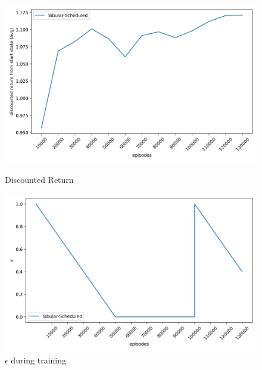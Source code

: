 \begin{figure}[H]
    \vspace{0.5em}

    \begin{minipage}{0.32\linewidth}
        \centering
        \includegraphics[width=\linewidth]{plots/part3-tabular-rewards.png}
        \caption{Discounted Return}
    \end{minipage}
    \hfill
    \begin{minipage}{0.32\linewidth}
        \centering
        \includegraphics[width=\linewidth]{plots/part3-tabular-epsilons.png}
        \caption{$\epsilon$ during training}


\end{minipage}
\end{figure}
